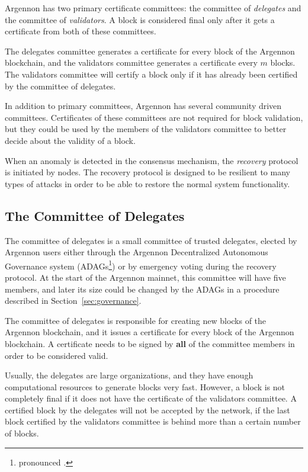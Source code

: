 
Argennon has two primary certificate committees: the committee of \emph{delegates} and the committee
of \emph{validators}. A block is considered final only after it gets a certificate from both of these committees.

The delegates committee generates a certificate for every block of the Argennon blockchain, and the
validators committee generates a certificate every $m$ blocks. The validators committee will
certify a block only if it has already been certified by the committee of delegates.

In addition to primary committees, Argennon has several community driven committees. Certificates of these
committees are not required for block validation, but they could be used by the members of the validators
committee to better decide about the validity of a block.

When an anomaly is detected in the consensus mechanism, the \emph{recovery} protocol is initiated by nodes. The
recovery protocol is designed to be resilient to many types of attacks in order to be able to restore the normal
system functionality.

\subsection{The Committee of Delegates}\label{subsec:the-committee-of-delegates}

The committee of delegates is a small committee of trusted delegates, elected by Argennon users either through the
Argennon Decentralized Autonomous Governance system (ADAGs\footnote{pronounced .}) or by emergency
voting during the recovery protocol. At the start of the Argennon mainnet, this committee will have
five members, and later its size could be changed by the ADAGs in a procedure described
in Section~\ref{sec:governance}.

The committee of delegates is responsible for creating new blocks of the Argennon blockchain, and it issues a
certificate for every block of the Argennon blockchain. A certificate needs to be signed
by \textbf{all} of the committee members in order to be considered valid.

Usually, the delegates are large organizations, and they have enough computational resources to generate blocks
very fast. However, a block is not completely final if it does not have the certificate of the validators committee.
A certified block by the delegates will not be accepted by the network, if the last block certified by
the validators committee is behind more than a certain number of blocks.

